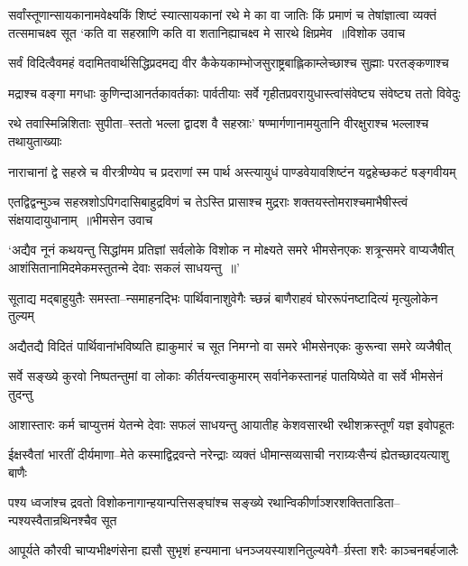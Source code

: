 \fourlineindentedshloka
{सर्वांस्तूणान्सायकानामवेक्ष्यकिं शिष्टं स्यात्सायकानां रथे मे}
{का वा जातिः किं प्रमाणं च तेषांज्ञात्वा व्यक्तं तत्समाचक्ष्व सूत}
{`कति वा सहस्राणि कति वा शतानिह्याचक्ष्व मे सारथे क्षिप्रमेव ॥विशोक उवाच}
{}


\threelineshloka
{सर्वं विदित्वैवमहं वदामितवार्थसिद्धिप्रदमद्य वीर}
{कैकेयकाम्भोजसुराष्ट्रबाह्लिकाम्लेच्छाश्च सुह्माः परतङ्कणाश्च}
{}


\twolineshloka
{मद्राश्च वङ्गा मगधाः कुणिन्दाआनर्तकावर्तकाः पार्वतीयाः}
{सर्वे गृहीतप्रवरायुधास्त्वांसंवेष्ट्य संवेष्ट्य ततो विवेदुः}


\twolineshloka
{रथे तवास्मिन्निशिताः सुपीता--स्ततो भल्ला द्वादश वै सहस्राः'}
{षण्मार्गणानामयुतानि वीरक्षुराश्च भल्लाश्च तथायुताख्याः}


\twolineshloka
{नाराचानां द्वे सहस्रे च वीरत्रीण्येप च प्रदराणां स्म पार्थ}
{अस्त्यायुधं पाण्डवेयावशिष्टंन यद्वहेच्छकटं षङ्गवीयम्}


\threelineshloka
{एतद्विद्वन्मुञ्च सहस्रशोऽपिगदासिबाहुद्रविणं च तेऽस्ति}
{प्रासाश्च मुद्रराः शक्तयस्तोमराश्चमाभैषीस्त्वं संक्षयादायुधानाम् ॥भीमसेन उवाच}
{}


\threelineshloka
{`अद्यैव नूनं कथयन्तु सिद्धांमम प्रतिज्ञां सर्वलोके विशोक}
{न मोक्ष्यते समरे भीमसेनएकः शत्रून्समरे वाप्यजैषीत्}
{आशंसितानामिदमेकमस्तुतन्मे देवाः सकलं साधयन्तु ॥'}


\twolineshloka
{सूताद्य मद्बाहुयुतैः समस्ता--न्समाहनद्भिः पार्थिवानाशुवेगैः}
{च्छन्नं बाणैराहवं घोररूपंनष्टादित्यं मृत्युलोकेन तुल्यम्}


\twolineshloka
{अद्यैतद्यै विदितं पार्थिवानांभविष्यति ह्याकुमारं च सूत}
{निमग्नो वा समरे भीमसेनएकः कुरून्वा समरे व्यजैषीत्}


\twolineshloka
{सर्वे सङ्ख्ये कुरवो निष्पतन्तुमां वा लोकाः कीर्तयन्त्वाकुमारम्}
{सर्वानेकस्तानहं पातयिष्येते वा सर्वे भीमसेनं तुदन्तु}


\twolineshloka
{आशास्तारः कर्म चाप्युत्तमं येतन्मे देवाः सफलं साधयन्तु}
{आयातीह केशवसारथी रथीशक्रस्तूर्णं यज्ञ इवोपहूतः}


\twolineshloka
{ईक्षस्वैतां भारतीं दीर्यमाणा--मेते कस्माद्विद्रवन्ते नरेन्द्राः}
{व्यक्तं धीमान्सव्यसाची नराग्र्यःसैन्यं ह्येतच्छादयत्याशु बाणैः}


\twolineshloka
{पश्य ध्वजांश्च द्रवतो विशोकनागान्हयान्पत्तिसङ्घांश्च सङ्ख्ये}
{रथान्विकीर्णाञ्शरशक्तिताडिता--न्पश्यस्वैतान्रथिनश्चैव सूत}


\twolineshloka
{आपूर्यते कौरवी चाप्यभीक्ष्णंसेना ह्यसौ सुभृशं हन्यमाना}
{धनञ्जयस्याशनितुल्यवेगै--र्ग्रस्ता शरैः काञ्चनबर्हजालैः}


